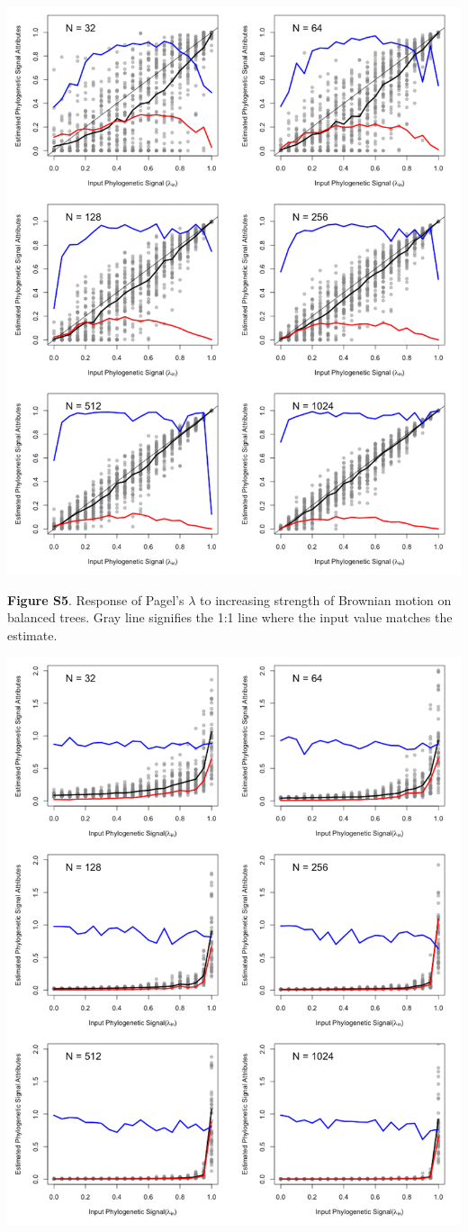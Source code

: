 \documentclass[
]{article}
\begin{document}
\includegraphics[width=0.95\linewidth]{fig.S5}

\textbf{Figure S5}. Response of Pagel's \(\lambda\) to increasing
strength of Brownian motion on balanced trees. Gray line signifies the
1:1 line where the input value matches the estimate.

\includegraphics[width=0.95\linewidth]{fig.S6}
\end{document}
